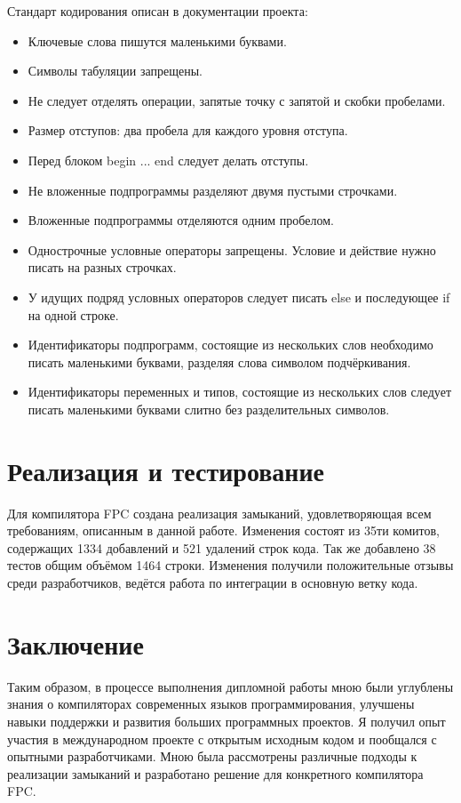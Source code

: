 \documentclass{imcs}
\begin{document}
Стандарт кодирования описан в документации проекта\cite{codingstyle}:
\begin{itemize}
  \item Ключевые слова пишутся маленькими буквами.
  \item Символы табуляции запрещены.
  \item Не следует отделять операции, запятые точку с запятой и скобки пробелами.
  \item Размер отступов: два пробела для каждого уровня отступа.
  \item Перед блоком begin ... end следует делать отступы.
  \item Не вложенные подпрограммы разделяют двумя пустыми строчками.
  \item Вложенные подпрограммы отделяются одним пробелом.
  \item Однострочные условные операторы запрещены. Условие и действие нужно писать на разных строчках.
  \item У идущих подряд условных операторов следует писать else и последующее if 
    на одной строке.
  \item Идентификаторы подпрограмм, состоящие из нескольких слов необходимо писать
    маленькими буквами, разделяя слова символом подчёркивания.
  \item Идентификаторы переменных и типов, состоящие из нескольких слов следует писать
    маленькими буквами слитно без разделительных символов.
\end{itemize}

\section{Реализация и тестирование}

Для компилятора FPC создана реализация замыканий, удовлетворяющая всем требованиям, описанным в данной работе.
Изменения состоят из 35ти комитов, содержащих 1334 добавлений и 521 удалений строк кода.
Так же добавлено 38 тестов общим объёмом 1464 строки. Изменения получили положительные отзывы
среди разработчиков, ведётся работа по интеграции в основную ветку кода\cite{mantis}.

\pagebreak

\section*{Заключение}

Таким образом, в процессе выполнения дипломной работы мною были углублены
знания о компиляторах современных языков программирования, улучшены навыки
поддержки и развития больших программных проектов. Я получил опыт участия в 
международном проекте с открытым исходным кодом и пообщался с опытными разработчиками.
Мною была рассмотрены различные подходы к реализации замыканий и разработано
решение для конкретного компилятора FPC.
\end{document}
